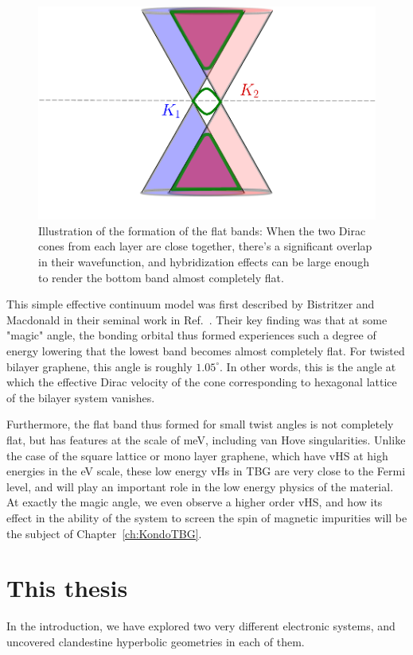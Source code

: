 \begin{figure}[!ht]
    \centering
    \includegraphics[width=0.5\linewidth]{figures/introduction/BandFlattening.pdf}
    \caption{Illustration of the formation of the flat bands: When the two Dirac cones from each layer are close together, there's a significant overlap in their wavefunction, and hybridization effects can be large enough to render the bottom band almost completely flat.}
    \label{fig:bandflattening}
\end{figure}
\par
This simple effective continuum model was first described by Bistritzer and Macdonald in their seminal work in Ref.~\cite{Bistritzer2011}. Their key finding was that at some "magic" angle, the bonding orbital thus formed experiences such a degree of energy lowering that the lowest band becomes almost completely flat. For twisted bilayer graphene, this angle is roughly $1.05^\circ$. In other words, this is the angle at which the effective Dirac velocity of the cone corresponding to hexagonal lattice of the bilayer system vanishes. 
\par
Furthermore, the flat band thus formed for small twist angles is not completely flat, but has features at the scale of meV, including van Hove singularities. Unlike the case of the square lattice or mono layer graphene, which have vHS at high energies in the eV scale, these low energy vHs in TBG are very close to the Fermi level, and will play an important role in the low energy physics of the material. At exactly the magic angle, we even observe a higher order vHS, and how its effect in the ability of the system to screen the spin of magnetic impurities will be the subject of Chapter~\ref{ch:KondoTBG}.

















\section{This thesis}
In the introduction, we have explored two very different electronic systems, and uncovered clandestine hyperbolic geometries in each of them.  

